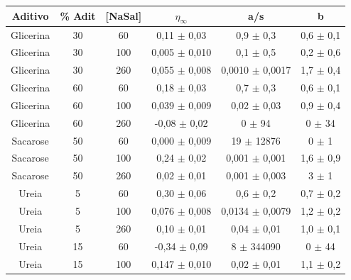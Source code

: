 	\begin{table}[h]
		{%
			\begin{tabular}{c c c c c c}
				\toprule
				 Aditivo  & \% Adit & [NaSal] & \(\eta_{\infty}\)   & a/s                         & b                        \\ \midrule
				Glicerina & 30      & 60      & 0,11  \(\pm\) 0,03  & 0,9     \(\pm\)     0,3     & 0,6   \(\pm\)   0,1     \\
				Glicerina & 30      & 100     & 0,005 \(\pm\) 0,010 & 0,1     \(\pm\)     0,5     & 0,2   \(\pm\)   0,6     \\
				Glicerina & 30      & 260     & 0,055 \(\pm\) 0,008 & 0,0010  \(\pm\)     0,0017  & 1,7   \(\pm\)   0,4     \\
				Glicerina & 60      & 60      & 0,18  \(\pm\) 0,03  & 0,7     \(\pm\)     0,3     & 0,6   \(\pm\)       0,1  \\
				Glicerina & 60      & 100     & 0,039 \(\pm\) 0,009 & 0,02    \(\pm\)     0,03    & 0,9   \(\pm\)    0,4      \\
				Glicerina & 60      & 260     & -0,08 \(\pm\) 0,02  & 0       \(\pm\)     94      & 0     \(\pm\)    34       \\
				Sacarose  & 50      & 60      & 0,000 \(\pm\) 0,009 & 19      \(\pm\)  12876      & 0     \(\pm\)     1      \\
				Sacarose  & 50      & 100     & 0,24  \(\pm\) 0,02  & 0,001   \(\pm\)       0,001 & 1,6   \(\pm\)    0,9  \\
				Sacarose  & 50      & 260     & 0,02  \(\pm\) 0,01  & 0,001   \(\pm\)      0,003  & 3     \(\pm\)    1      \\ \midrule
				  Ureia   & 5       & 60      & 0,30  \(\pm\) 0,06  & 0,6     \(\pm\)     0,2     & 0,7   \(\pm\)   0,2     \\
				  Ureia   & 5       & 100     & 0,076 \(\pm\) 0,008 & 0,0134  \(\pm\)      0,0079 & 1,2   \(\pm\)   0,2     \\
				  Ureia   & 5       & 260     & 0,10  \(\pm\) 0,01  & 0,04    \(\pm\)       0,01  & 1,0   \(\pm\)       0,1   \\
				  Ureia   & 15      & 60      & -0,34 \(\pm\) 0,09  & 8       \(\pm\)  344090     & 0     \(\pm\)    44     \\
				  Ureia   & 15      & 100     & 0,147 \(\pm\) 0,010 & 0,02    \(\pm\)        0,01 & 1,1   \(\pm\)   0,2    \\

\end{tabular}}
\end{table}
